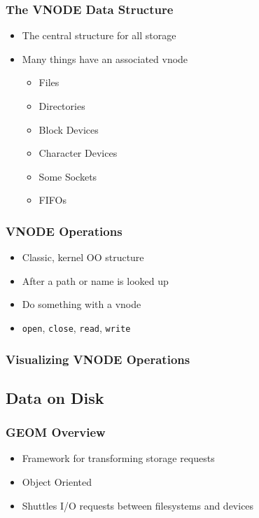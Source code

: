 \documentclass[pdftex]{beamer} %
\begin{document}
\begin{frame}
  \frametitle{The VNODE Data Structure}
  \begin{itemize}
  \item The central structure for all storage
  \item Many things have an associated vnode
    \begin{itemize}
    \item Files
    \item Directories
    \item Block Devices
    \item Character Devices
    \item Some Sockets
    \item FIFOs
    \end{itemize}
  \end{itemize}
\end{frame}

\begin{frame}[fragile]
  \frametitle{VNODE Operations}
  \begin{itemize}
  \item Classic, kernel OO structure
  \item After a path or name is looked up
  \item Do something with a vnode
  \item \verb|open|, \verb|close|, \verb|read|, \verb|write|
  \end{itemize}
\end{frame}

\begin{frame}
  \frametitle{Visualizing VNODE Operations}
  
\end{frame}

\subsection{Data on Disk}
\label{sec:disk}

\begin{frame}
  \frametitle{GEOM Overview}
  \begin{itemize}
  \item Framework for transforming storage requests
  \item Object Oriented
  \item Shuttles I/O requests between filesystems and devices
  \end{itemize}
\end{frame}
\end{document}
